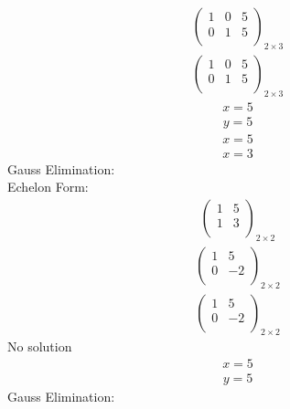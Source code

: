 \documentclass{article}
\begin{document}
\begin{align*}
\left(
\begin{array}{cc|c}
1 & 0 & 5\\
0 & 1 & 5\\
\end{array}
\right)_{2\times 3}
\end{align*}
\begin{align*}
\left(
\begin{array}{cc|c}
1 & 0 & 5\\
0 & 1 & 5\\
\end{array}
\right)_{2\times 3}
\end{align*}
\begin{align*}
x=5\end{align*}
\begin{align*}
y=5\end{align*}
\begin{align*}
x=5\end{align*}
\begin{align*}
x=3\end{align*}
Gauss Elimination:\\
Echelon Form:\\
\begin{align*}
\left(
\begin{array}{c|c}
1 & 5\\
1 & 3\\
\end{array}
\right)_{2\times 2}
\end{align*}
\begin{align*}
\left(
\begin{array}{c|c}
1 & 5\\
0 & -2\\
\end{array}
\right)_{2\times 2}
\end{align*}
\begin{align*}
\left(
\begin{array}{c|c}
1 & 5\\
0 & -2\\
\end{array}
\right)_{2\times 2}
\end{align*}
No solution\\
\begin{align*}
x=5\end{align*}
\begin{align*}
y=5\end{align*}
Gauss Elimination:\\
\end{document}
